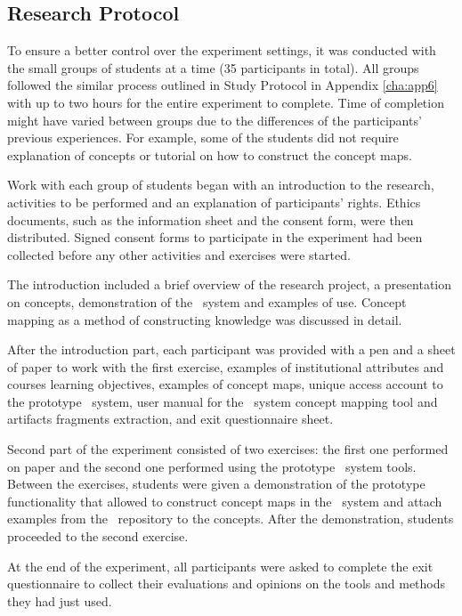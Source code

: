 \subsection{Research Protocol}

To ensure a better control over the experiment settings, it was conducted with
the small groups of students at a time (35 participants in total). All groups
followed the similar process outlined in Study Protocol in Appendix
\ref{cha:app6} with up to two hours for the entire experiment to complete. Time
of completion might have varied between groups due to the differences of the 
participants' previous experiences. For example, some of the students did not
require explanation of \LLLs concepts or tutorial on how to construct the
concept maps.

Work with each group of students began with an introduction to the research,
activities to be performed and an explanation of participants' rights.
Ethics documents, such as the information sheet and the consent form, were then
distributed. Signed consent forms to participate in the experiment had been
collected before any other activities and exercises were started.

The introduction included a brief overview of the research project, a
presentation on \LLLs concepts, demonstration of the \ep~system and examples of
use. Concept mapping as a method of constructing knowledge was discussed in
detail.

After the introduction part, each participant was provided with a pen and a
sheet of paper to work with the first exercise, examples of institutional
attributes and courses learning objectives, examples of concept maps, unique
access account to the prototype \ep~system, user manual for the \ep~system
concept mapping tool and artifacts fragments extraction, and exit questionnaire
sheet.

Second part of the experiment consisted of two exercises: the first one
performed on paper and the second one performed using the prototype \ep~system
tools. Between the exercises, students were given a demonstration of the
prototype functionality that allowed to construct concept maps in the \ep~system
and attach examples from the \ep~repository to the concepts. After the
demonstration, students proceeded to the second exercise. 

At the end of the experiment, all participants were asked to complete the exit
questionnaire to collect their evaluations and opinions on the tools and methods
they had just used.

